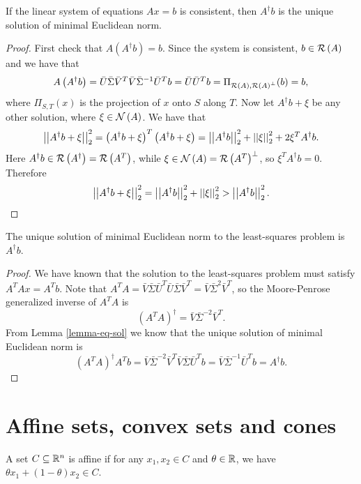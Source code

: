 \documentclass[12pt]{article}
\begin{document}
\begin{lemma}\label{lemma-eq-sol}
    If the linear system of equations \(Ax=b\) is consistent, then \(A^\dagger b\) is the unique solution of minimal Euclidean norm.
\end{lemma}
\begin{proof}
    First check that \(A\left(A^\dagger b\right)=b\). Since the system is consistent, \(b\in\mathcal R\left(A\right)\) and we have that
    \[A\left(A^\dagger b\right)=\bar U\bar\Sigma\bar V^T\bar V\bar\Sigma^{-1}\bar U^Tb=\bar U\bar U^Tb=\Pi_{\mathcal R\left(A\right),\mathcal R\left(A\right)^\perp}(b)=b,\]
    where \(\Pi_{S,T}(x)\) is the projection of \(x\) onto \(S\) along \(T\). Now let \(A^\dagger b+\xi\) be any other solution, where \(\xi\in\mathcal N\left(A\right)\). We have that
    \[\left|\left|A^\dagger b+\xi\right|\right|_2^2=\left(A^\dagger b+\xi\right)^T\left(A^\dagger b+\xi\right)=\left|\left|A^\dagger b\right|\right|_2^2+\left|\left|\xi\right|\right|_2^2+2\xi^TA^\dagger b.\]
    Here \(A^\dagger b\in\mathcal R\left(A^\dagger\right)=\mathcal R\left(A^T\right)\), while \(\xi\in\mathcal N\left(A\right)=\mathcal R\left(A^T\right)^\perp\), so \(\xi^TA^\dagger b=0\). Therefore
    \[\left|\left|A^\dagger b+\xi\right|\right|_2^2=\left|\left|A^\dagger b\right|\right|_2^2+\left|\left|\xi\right|\right|_2^2>\left|\left|A^\dagger b\right|\right|_2^2.\]
\end{proof}

\begin{proposition}
    The unique solution of minimal Euclidean norm to the least-squares problem is \(A^\dagger b\).
\end{proposition}
\begin{proof}
    We have known that the solution to the least-squares problem must satisfy \(A^TAx=A^Tb\). Note that \(A^TA=\bar V\bar\Sigma\bar U^T\bar U\bar\Sigma\bar V^T=\bar V\bar\Sigma^2\bar V^T\), so the Moore-Penrose generalized inverse of \(A^TA\) is
    \[\left(A^TA\right)^\dagger=\bar V\bar\Sigma^{-2}\bar V^T.\]
    From Lemma \ref{lemma-eq-sol} we know that the unique solution of minimal Euclidean norm is
    \[\left(A^TA\right)^\dagger A^Tb=\bar V\bar\Sigma^{-2}\bar V^T\bar V\bar\Sigma\bar U^Tb=\bar V\bar\Sigma^{-1}\bar U^Tb=A^\dagger b.\]
\end{proof}

\section{Affine sets, convex sets and cones}

\begin{definition}
    A set \(C\subseteq\mathbb R^n\) is \textnormal{affine} if for any \(x_1,x_2\in C\) and \(\theta\in\mathbb R\), we have \(\theta x_1+(1-\theta)x_2\in C\).
\end{definition}
\end{document}

